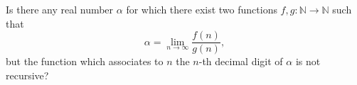 Is there any real number $\alpha$ for which there exist two functions $f,g: \mathbb{N} \to  \mathbb{N}$ such that
$$\alpha=\lim_{n \to  \infty} \frac{f(n)}{g(n)},$$but the function which associates to $n$ the $n$-th decimal digit of $\alpha$ is not recursive?